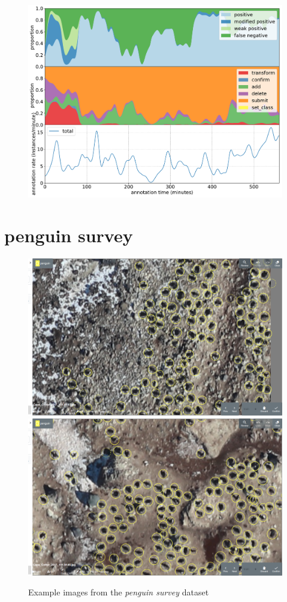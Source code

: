 \begin{figure}[!h]
\centering
\includegraphics[width=1.0\linewidth]{charts/action_annotations/scallops.pdf}
\caption{  }
\label{fig:scallop_annotation}
\end{figure}

\pagebreak
\section {penguin survey}


\begin{figure}[!h]
\centering
  \includegraphics[width=0.475\linewidth]{figures/annotation/screenshots/penguins_aerial.png}
  \hfill
  \includegraphics[width=0.475\linewidth]{figures/annotation/screenshots/penguins_aerial2.png}
  \caption{}
\caption{ Example images from the \emph{penguin survey} dataset}
\label {fig:penguin_aerial_examples}
\end{figure}

